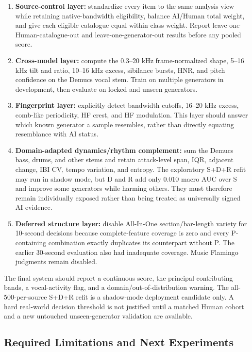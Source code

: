 \documentclass[11pt,a4paper]{article}
\begin{document}
\begin{enumerate}
  \item \textbf{Source-control layer:} standardize every item to the same analysis view while retaining native-bandwidth eligibility, balance AI/Human total weight, and give each eligible catalogue equal within-class weight. Report leave-one-Human-catalogue-out and leave-one-generator-out results before any pooled score.
  \item \textbf{Cross-model layer:} compute the 0.3--20 kHz frame-normalized shape, 5--16 kHz tilt and ratio, 10--16 kHz excess, sibilance bursts, HNR, and pitch confidence on the Demucs vocal stem. Train on multiple generators in development, then evaluate on locked and unseen generators.
  \item \textbf{Fingerprint layer:} explicitly detect bandwidth cutoffs, 16--20 kHz excess, comb-like periodicity, HF crest, and HF modulation. This layer should answer which known generator a sample resembles, rather than directly equating resemblance with AI status.
  \item \textbf{Domain-adapted dynamics/rhythm complement:} sum the Demucs bass, drums, and other stems and retain attack-level span, IQR, adjacent change, IBI CV, tempo variation, and entropy. The exploratory S+D+R refit may run in shadow mode, but D and R add only 0.010 macro AUC over S and improve some generators while harming others. They must therefore remain individually exposed rather than being treated as universally signed AI evidence.
  \item \textbf{Deferred structure layer:} disable All-In-One section/bar-length variety for 10-second decisions because complete-feature coverage is zero and every P-containing combination exactly duplicates its counterpart without P. The earlier 30-second evaluation also had inadequate coverage. Music Flamingo judgments remain disabled.
\end{enumerate}

The final system should report a continuous score, the principal contributing bands, a vocal-activity flag, and a domain/out-of-distribution warning. The all-500-per-source S+D+R refit is a shadow-mode deployment candidate only. A hard real-world decision threshold is not justified until a matched Human cohort and a new untouched unseen-generator validation are available.

\subsection{Required Limitations and Next Experiments}
\end{document}
